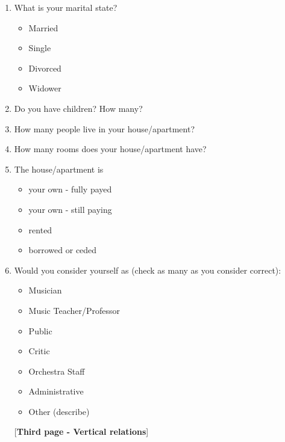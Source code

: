 \documentclass[a4paper, 12pt, openright, oneside, german, french, brazil, english]{abntex2}
\begin{document}
\begin{enumerate}
        \item What is your marital state?
          \begin{itemize}
          \item Married
          \item Single
          \item Divorced
          \item Widower
          \end{itemize}

         
        \item Do you have children? How many?

        \item How many people live in your house/apartment?
        \item How many rooms does your house/apartment have?
          
        \item The house/apartment is
          \begin{itemize}
          \item your own - fully payed
          \item your own - still paying
          \item rented
          \item borrowed or ceded
          \end{itemize}
          
        \item Would you consider yourself as (check as many as you consider correct):
          \begin{itemize}
          \item Musician
          \item Music Teacher/Professor
          \item Public
          \item Critic
          \item Orchestra Staff
          \item Administrative
          \item Other (describe)
          \end{itemize}


        [\textbf{Third page - Vertical relations}]  


\end{enumerate}
\end{document}
